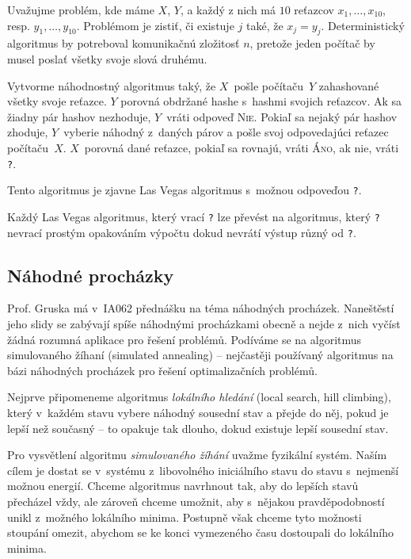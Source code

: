 \begin{example}
    Uvažujme problém, kde máme $X$, $Y$, a každý z nich má $10$ reťazcov
	$x_1, \ldots, x_10$, resp. $y_1, \ldots, y_10$. Problémom je zistiť,
	či existuje $j$ také, že $x_j = y_j$. Deterministický algoritmus 
	by potreboval komunikačnú zložitosť $n$, pretože jeden počítač
	by musel poslať všetky svoje slová druhému.
	
	Vytvorme náhodnostný algoritmus taký, že $X$~pošle počítaču~$Y$
	zahashované všetky svoje reťazce. $Y$ porovná obdržané hashe 
	s~hashmi svojich reťazcov. Ak sa žiadny pár hashov nezhoduje, 
	$Y$~vráti odpoveď \textsc{Nie}. Pokiaľ sa nejaký pár hashov
	zhoduje, $Y$~vyberie náhodný z~daných párov a pošle svoj odpovedajúci
	reťazec počítaču~$X$. $X$~porovná dané reťazce, pokiaľ sa rovnajú, 
	vráti \textsc{Áno}, ak nie, vráti \verb|?|.
	
	Tento algoritmus je zjavne Las Vegas algoritmus s~možnou odpoveďou \verb|?|.
\end{example}

Každý Las Vegas algoritmus, který vrací \verb|?| lze převést na
algoritmus, který \verb|?| nevrací prostým opakováním výpočtu dokud
nevrátí výstup různý od \verb|?|.


\subsection{Náhodné procházky}

Prof. Gruska má v~IA062 přednášku na téma náhodných procházek.
Naneštěstí jeho slidy se zabývají spíše náhodnými procházkami obecně
a nejde z~nich vyčíst žádná rozumná aplikace pro řešení problémů.
Podíváme se na algoritmus simulovaného žíhaní (simulated annealing) --
nejčastěji používaný algoritmus na bázi náhodných procházek pro řešení
optimalizačních problémů.

Nejprve připomeneme algoritmus {\em lokálního hledání} (local search,
hill climbing), který v~každém stavu vybere náhodný sousední stav a
přejde do něj, pokud je lepší než současný -- to opakuje tak dlouho,
dokud existuje lepší sousední stav.



Pro vysvětlení algoritmu {\em simulovaného žíhání} uvažme fyzikální
systém. Naším cílem je dostat se v~systému z~libovolného iniciálního
stavu do stavu s~nejmenší možnou energií. Chceme algoritmus navrhnout
tak, aby do lepších stavů přecházel vždy, ale zároveň chceme umožnit,
aby s~nějakou pravděpodobností unikl z~možného lokálního minima.
Postupně však chceme tyto možnosti stoupání omezit, abychom
se ke konci vymezeného času dostoupali do lokálního minima.

